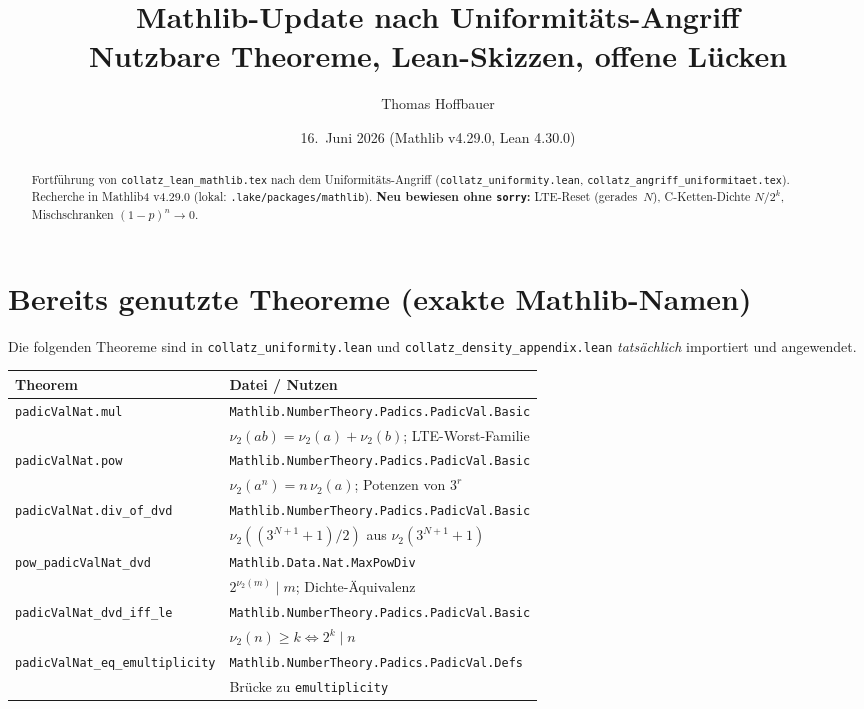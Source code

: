\documentclass[12pt,a4paper]{article}
\title{Mathlib-Update nach Uniformitäts-Angriff\\[0.2em]
\large Nutzbare Theoreme, Lean-Skizzen, offene Lücken}
\author{Thomas Hoffbauer}
\date{16.\ Juni 2026 \quad (Mathlib v4.29.0, Lean 4.30.0)}
\newcommand{\Mathlib}[1]{\texttt{Mathlib.\allowbreak #1}}
\newcommand{\vii}{\nu_2}
\begin{document}
\maketitle

\begin{abstract}
Fortführung von \texttt{collatz\_lean\_mathlib.tex} nach dem Uniformitäts-Angriff
(\texttt{collatz\_uniformity.lean}, \texttt{collatz\_angriff\_uniformitaet.tex}).
Recherche in Mathlib4 v4.29.0 (lokal: \texttt{.lake/packages/mathlib}).
\textbf{Neu bewiesen ohne \texttt{sorry}:} LTE-Reset (gerades~$N$), C-Ketten-Dichte
$N/2^k$, Mischschranken $(1-p)^n\to 0$.
\end{abstract}

\tableofcontents
\bigskip

\section{Bereits genutzte Theoreme (exakte Mathlib-Namen)}
\label{sec:genutzt}

Die folgenden Theoreme sind in \texttt{collatz\_uniformity.lean} und
\texttt{collatz\_density\_appendix.lean} \emph{tatsächlich} importiert und angewendet.

\begin{tcolorbox}[vorhanden,title={Padics / 2-adisch}]
\begin{tabular}{@{}p{5.8cm}p{7.8cm}@{}}
\textbf{Theorem} & \textbf{Datei / Nutzen} \\
\midrule
\texttt{padicValNat.mul} & \Mathlib{NumberTheory.Padics.PadicVal.Basic} \\
& $\vii(ab)=\vii(a)+\vii(b)$; LTE-Worst-Familie \\
\texttt{padicValNat.pow} & \Mathlib{NumberTheory.Padics.PadicVal.Basic} \\
& $\vii(a^n)=n\,\vii(a)$; Potenzen von $3^r$ \\
\texttt{padicValNat.div\_of\_dvd} & \Mathlib{NumberTheory.Padics.PadicVal.Basic} \\
& $\vii((3^{N+1}+1)/2)$ aus $\vii(3^{N+1}+1)$ \\
\texttt{pow\_padicValNat\_dvd} & \Mathlib{Data.Nat.MaxPowDiv} \\
& $2^{\vii(m)}\mid m$; Dichte-Äquivalenz \\
\texttt{padicValNat\_dvd\_iff\_le} & \Mathlib{NumberTheory.Padics.PadicVal.Basic} \\
& $\vii(n)\geq k \Leftrightarrow 2^k\mid n$ \\
\texttt{padicValNat\_eq\_emultiplicity} & \Mathlib{NumberTheory.Padics.PadicVal.Defs} \\
& Brücke zu \texttt{emultiplicity} \\
\end{tabular}
\end{tcolorbox}
\end{document}
